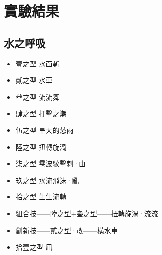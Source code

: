 \chapter{實驗結果}\label{result}

\section{水之呼吸}
\begin{itemize}
\item 壹之型 水面斬
\item 貳之型 水車
\item 叄之型 流流舞
\item 肆之型 打擊之潮
\item 伍之型 旱天的慈雨
\item 陸之型 扭轉旋渦
\item 柒之型 雫波紋擊刺·曲
\item 玖之型 水流飛沫·亂
\item 拾之型 生生流轉
\item 組合技——陸之型+叄之型——扭轉旋渦·流流
\item 創新技——貳之型·改——橫水車
\item 拾壹之型 凪
\end{itemize}

